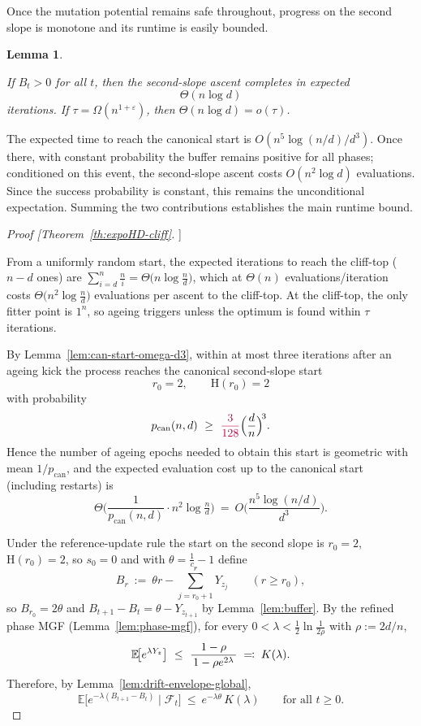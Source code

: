\documentclass[lettersize,journal]{IEEEtran}
\newcommand{\rerev}[1]{\textcolor{purple}{#1}}
\newcommand{\EE}{\mathbb{E}}
\newtheorem{lemma}{Lemma}
\begin{document}
{Once the mutation potential remains safe throughout, progress on the second 
slope is monotone and its runtime is easily bounded.



\begin{lemma}\label{prop:climb-time}
	
	If $B_t>0$ for all $t$, then the second-slope ascent completes in expected
	\[
	\Theta(n\log d)
	\]
	iterations.  
	If $\tau=\Omega(n^{1+\varepsilon})$, then $\Theta(n\log d)=o(\tau)$.
\end{lemma}



The expected time to reach the canonical start is 
$O(n^{5}\log(n/d)/d^{3})$.  
Once there, with constant probability the buffer remains positive for all 
phases; conditioned on this event, the second-slope ascent costs 
$O(n^{2}\log d)$ evaluations.  
Since the success probability is constant, this remains the unconditional 
expectation.  
Summing the two contributions establishes the main runtime bound.

\begin{proof}[Proof [Theorem~\ref{th:expoHD-cliff}]]
	
	From a uniformly random start, the expected iterations to reach the cliff-top ($n-d$ ones) are
	$\sum_{i=d}^{n}\frac{n}{i}=\Theta\!\big(n\log\tfrac{n}{d}\big)$, which at $\Theta(n)$ evaluations/iteration costs
	$\Theta\!\big(n^{2}\log\tfrac{n}{d}\big)$ evaluations per ascent to the cliff-top. At the cliff-top, the only fitter point is $1^n$, so ageing triggers unless the optimum is found within $\tau$ iterations.
	
	By Lemma~\ref{lem:can-start-omega-d3}, within at most three iterations after an ageing kick the process reaches the canonical second-slope start
	\[
	r_0=2,\qquad \text{H}(r_0)=2
	\]
	with probability
	\[
	p_{\mathrm{can}}(n,d)\ \ge\ \rerev{\frac{3}{128}}\Big(\frac{d}{n}\Big)^{\!3}.
	\]
	Hence the number of ageing epochs needed to obtain this start is geometric with mean $1/p_{\mathrm{can}}$, and the expected evaluation cost up to the canonical start (including restarts) is
	\[
	\Theta\!\Big(\frac{1}{p_{\mathrm{can}}(n,d)}\cdot n^{2}\log\tfrac{n}{d}\Big)
	\ =\ O\!\Big(\frac{n^{5}\log(n/d)}{d^{3}}\Big).
	\]
	
	\smallskip
	Under the reference-update rule the start on the second slope is $r_0=2$, $\text{H}(r_0)=2$, so $s_0=0$ and with $\theta=\tfrac1c-1$ define
	\[
	B_r\ :=\ \theta r - \sum_{j=r_0+1}^{r} Y_{z_j}\qquad(r\ge r_0),
	\]
	so $B_{r_0}=2\theta$ and $B_{t+1}-B_t=\theta-Y_{z_{t+1}}$ by Lemma~\ref{lem:buffer}.
	By the refined phase MGF (Lemma~\ref{lem:phase-mgf}), for every $0<\lambda<\tfrac12\ln\!\tfrac{1}{2\rho}$ with $\rho:=2d/n$,
	\[
	\textcolor{black}{\EE\!\big[e^{\lambda Y_z}\big]\ \le\ \frac{1-\rho}{\,1-\rho e^{2\lambda}\,} \;\eqqcolon\; K(\lambda).}
	\]
	Therefore, by Lemma~\ref{lem:drift-envelope-global},
	\[
	\EE\!\big[e^{-\lambda(B_{t+1}-B_t)}\mid\mathcal F_t\big]\ \le\ e^{-\lambda\theta}\,K(\lambda)\qquad\text{for all }t\ge 0.
	\]
	

\end{proof}}
\end{document}
